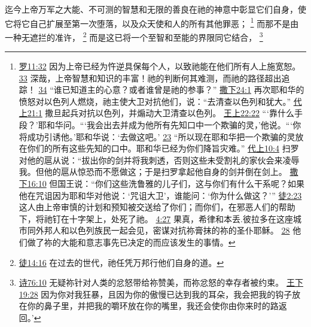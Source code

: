 \documentclass[12pt, a4paper, oneside]{ctexart}
\newcounter{parnum}[section]
\newcommand{\N}{%
   \noindent\refstepcounter{parnum}%
    \makebox[\parindent][l]{\textbf{\arabic{parnum}.}}}
\begin{document}
\N 迄今上帝万军之大能、不可测的智慧和无限的善良在祂的神意中彰显它们自身，使它将它自己扩展至第一次堕落，以及众天使和人的所有其他罪恶；
	\footnote {
		\href{https://biblehub.com/romans/11-32.htm}{罗11:32} 因为上帝已经为忤逆具保每个人，以致祂能在他们所有人上施宽恕。
		\href{https://biblehub.com/romans/11-33.htm}{33} 深哉，上帝智慧和知识的丰富！祂的判断何其难测，而祂的路径超出追踪！
		\href{https://biblehub.com/romans/11-34.htm}{34} “谁已知道主的心意？或者谁曾是祂的参事？”
		\href{https://biblehub.com/2_samuel/24-1.htm}{撒下24:1} 再次耶和华的愤怒对以色列人燃烧，祂主使大卫对抗他们，说：“去清查以色列和犹大。”
		\href{https://biblehub.com/1_chronicles/21-1.htm}{代上21:1} 撒旦起兵对抗以色列，并煽动大卫清查以色列。
		\href{https://biblehub.com/1_kings/22-22.htm}{王上22:22} “‘靠什么手段？’耶和华问。“‘我会出去并成为他所有先知口中一个欺骗的灵，’他说。“‘你将成功引诱他。’耶和华说：‘去做这吧。’
		\href{https://biblehub.com/1_kings/22-23.htm}{23} “所以现在耶和华把一个欺骗的灵放在你们的所有这些先知的口中。耶和华已经为你们降旨灾难。”
		\href{https://biblehub.com/1_chronicles/10-4.htm}{代上10:4} 扫罗对他的扈从说：“拔出你的剑并将我刺透，否则这些未受割礼的家伙会来凌辱我。但他的扈从惊恐而不愿做这；于是扫罗拿起他自身的剑并倒在剑上。
		\href{https://biblehub.com/2_samuel/16-10.htm}{撒下16:10} 但国王说：“你们这些洗鲁雅的儿子们，这与你们有什么干系呢？如果他在咒诅因为耶和华对他说：‘咒诅大卫’，谁能问：‘你为什么做这？’”
		\href{https://biblehub.com/acts/2-23.htm}{徒2:23} 这人由上帝审慎的计划和预知被交送给了你们；而你们，在邪恶人们的帮助下，将祂钉在十字架上，处死了祂。
		\href{https://biblehub.com/acts/4-27.htm}{4:27} 果真，希律和本丢.彼拉多在这座城市同外邦人和以色列族民一起会见，密谋对抗祢膏抹的祢的圣仆耶稣。
		\href{https://biblehub.com/acts/4-28.htm}{28} 他们做了祢的大能和意志事先已决定的而应该发生的事情。
	}
	而那不是由一种无遮拦的准许，
	\footnote {
		\href{https://biblehub.com/acts/14-16.htm}{徒14:16} 在过去的世代，祂任凭万邦行他们自身的道。
	}
	而是这已将一个至智和至能的界限同它结合，
	\footnote {
		\href{https://biblehub.com/psalms/76-10.htm}{诗76:10} 无疑祢针对人类的忿怒带给祢赞美，而祢忿怒的幸存者被约束。
		\href{https://biblehub.com/2_kings/19-28.htm}{王下19:28} 因为你对我狂暴，且因为你的傲慢已达到我的耳朵，我会把我的钩子放在你的鼻子里，并把我的嚼环放在你的嘴里，我还会使你由你来时的路返回。’
	}
\end{document}
